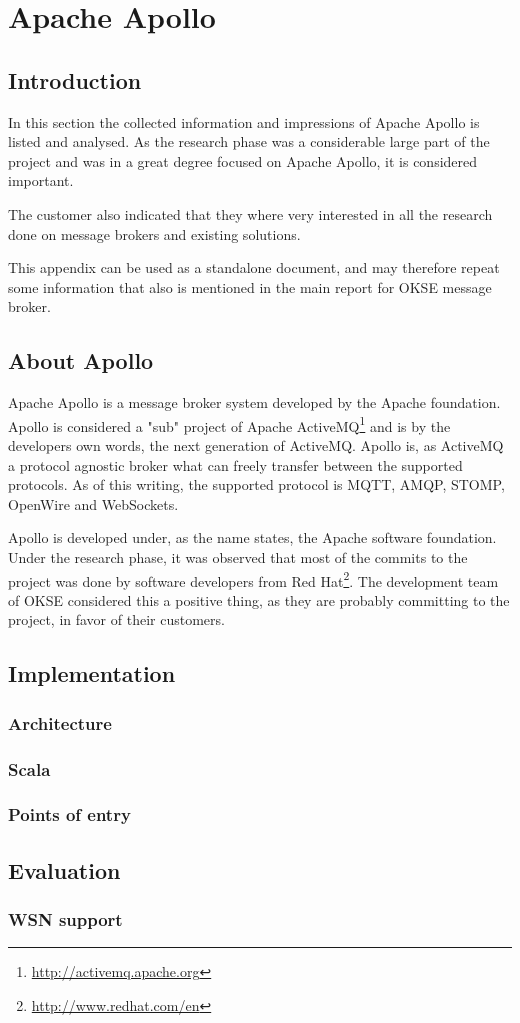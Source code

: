 \chapter{Apache Apollo}
\label{appendix:apache-apollo}

\section{Introduction}
In this section the collected information and impressions of Apache Apollo is listed and analysed. As the research phase was a considerable large part of the project and was in a great degree focused on Apache Apollo, it is considered important.

The customer also indicated that they where very interested in all the research done on message brokers and existing solutions.

This appendix can be used as a standalone document, and may therefore repeat some information that also is mentioned in the main report for OKSE message broker.

\section{About Apollo}
Apache Apollo is a message broker system developed by the Apache foundation. Apollo is considered a "sub" project of Apache ActiveMQ\footnote{\url{http://activemq.apache.org}} and is by the developers own words, the next generation of ActiveMQ. Apollo is, as ActiveMQ a protocol agnostic broker what can freely transfer between the supported protocols. As of this writing, the supported protocol is MQTT, AMQP, STOMP, OpenWire and WebSockets. 

Apollo is developed under, as the name states, the Apache software foundation. Under the research phase, it was observed that most of the commits to the project was done by software developers from Red Hat\footnote{\url{http://www.redhat.com/en}}. The development team of OKSE considered this a positive thing, as they are probably committing to the project, in favor of their customers. 

\section{Implementation}

\subsection{Architecture}

\subsection{Scala}

\subsection{Points of entry}


\section{Evaluation}

\subsection{WSN support}

\clearpage
